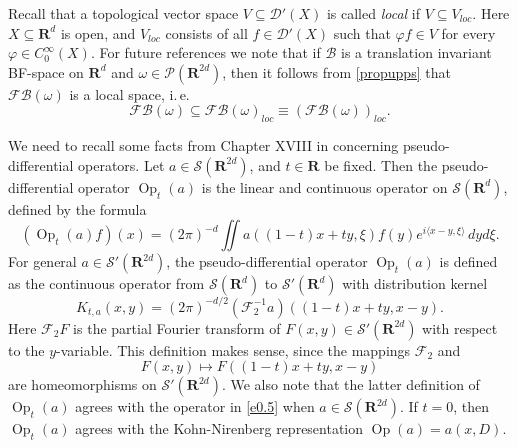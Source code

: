 \documentclass[12pt,a4paper,reqno]{amsart}
\numberwithin{equation}{section}
\numberwithin{thm}{section}
\theoremstyle{definition}
\theoremstyle{remark}
\begin{document}
\par

Recall that a topological vector space $V\subseteq \mathscr
D'(X)$ is called \emph{local} if $V\subseteq V_{loc}$. Here
$X\subseteq {\mathbf R^{d}}$ is open, and $V_{loc}$ consists of all $f\in
\mathscr D'(X)$ such that ${\varphi} f \in V$ for every ${\varphi} \in C_0^\infty
(X)$. For future references we note that if $\mathscr B$ is a
translation invariant BF-space on ${\mathbf R^{d}}$ and $\omega \in \mathscr
P({\mathbf R^{{2d}}})$, then it follows from \eqref{propupps} that ${\mathscr F\! \mathscr B}(\omega
)$ is a local space, i.{\,}e.
\begin{equation}\label{Blocal}
{\mathscr F\! \mathscr B} (\omega )\subseteq {\mathscr F\! \mathscr B} (\omega )_{loc}\equiv ({\mathscr F\! \mathscr B} (\omega ))_{loc}.
\end{equation}

\medspace

We need to recall some facts from Chapter XVIII in \cite {Ho1}
concerning pseudo-differential operators. Let $a\in
\mathscr S({\mathbf R^{{2d}}})$, and $t\in \mathbf R$ be fixed. Then
the pseudo-differential operator ${\operatorname{Op}} _t(a)$ is the linear and
continuous operator on $\mathscr S({\mathbf R^{d}})$, defined by the formula
\begin{equation}\label{e0.5}
({\operatorname{Op}} _t(a)f)(x)
=
(2\pi ) ^{-d}\iint a((1-t)x+ty,\xi )f(y)e^{i{\langle {x-y},\xi\rangle} }\,
dyd\xi .
\end{equation}
For general $a\in \mathscr S'({\mathbf R^{{2d}}})$, the pseudo-differential
operator ${\operatorname{Op}} _t(a)$ is defined as the continuous operator from
$\mathscr S({\mathbf R^{d}})$ to $\mathscr S'({\mathbf R^{d}})$ with distribution
kernel
\begin{equation}\label{weylkernel}
K_{t,a}(x,y)=(2\pi )^{-d/2}(\mathscr F_2^{-1}a)((1-t)x+ty,x-y).
\end{equation}
Here $\mathscr F_2F$ is the partial Fourier transform of
$F(x,y)\in \mathscr S'({\mathbf R^{{2d}}})$ with respect to the $y$-variable.
This definition makes sense, since the mappings $\mathscr F_2$ and
$$
F(x,y)\mapsto F((1-t)x+ty,x-y)
$$
are homeomorphisms on $\mathscr
S'({\mathbf R^{{2d}}})$. We also note that the latter definition of ${\operatorname{Op}} _t(a)$
agrees with the operator in \eqref{e0.5} when $a\in \mathscr S({\mathbf R^{{2d}}})$. If  $t=0$, then ${\operatorname{Op}} _t(a)$ agrees with the Kohn-Nirenberg
representation ${\operatorname{Op}} (a)=a(x,D)$.
\end{document}
